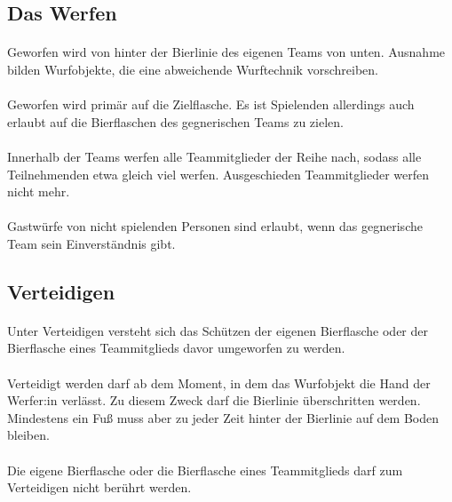 \subsection{Das Werfen}
\paragraph{}
Geworfen wird von hinter der Bierlinie des eigenen Teams von unten.
Ausnahme bilden Wurfobjekte, die eine abweichende Wurftechnik vorschreiben.

\paragraph{}
Geworfen wird primär auf die Zielflasche.
Es ist Spielenden allerdings auch erlaubt auf die Bierflaschen des gegnerischen Teams zu zielen.

\paragraph{}
Innerhalb der Teams werfen alle Teammitglieder der Reihe nach, sodass alle Teilnehmenden etwa gleich viel werfen.
Ausgeschieden Teammitglieder werfen nicht mehr.

\paragraph{}
Gastwürfe von nicht spielenden Personen sind erlaubt, wenn das gegnerische Team sein Einverständnis gibt.


\subsection{Verteidigen}
\paragraph{}
Unter Verteidigen versteht sich das Schützen der eigenen Bierflasche oder der Bierflasche eines Teammitglieds davor umgeworfen zu werden.

\paragraph{}
Verteidigt werden darf ab dem Moment, in dem das Wurfobjekt die Hand der Werfer:in verlässt.
Zu diesem Zweck darf die Bierlinie überschritten werden.
Mindestens ein Fuß muss aber zu jeder Zeit hinter der Bierlinie auf dem Boden bleiben.

\paragraph{}
Die eigene Bierflasche oder die Bierflasche eines Teammitglieds darf zum Verteidigen nicht berührt werden.

